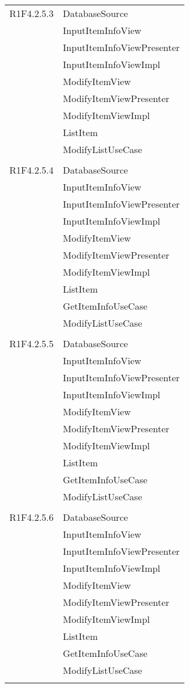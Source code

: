 \begin{center}
\begin{longtable}{|p{7cm}|p{5cm}|}
		R1F4.2.5.3 & DatabaseSource \\ & InputItemInfoView \\ & InputItemInfoViewPresenter \\ & InputItemInfoViewImpl \\ & ModifyItemView \\ & ModifyItemViewPresenter \\ & ModifyItemViewImpl \\ & ListItem \\ & ModifyListUseCase \\ & \\ \hline
		R1F4.2.5.4 & DatabaseSource \\ & InputItemInfoView \\ & InputItemInfoViewPresenter \\ & InputItemInfoViewImpl \\ & ModifyItemView \\ & ModifyItemViewPresenter \\ & ModifyItemViewImpl \\ & ListItem \\ & GetItemInfoUseCase \\ & ModifyListUseCase \\ & \\ \hline
		R1F4.2.5.5 & DatabaseSource \\ & InputItemInfoView \\ & InputItemInfoViewPresenter \\ & InputItemInfoViewImpl \\ & ModifyItemView \\ & ModifyItemViewPresenter \\ & ModifyItemViewImpl \\ & ListItem \\ & GetItemInfoUseCase \\ & ModifyListUseCase \\ & \\ \hline
		R1F4.2.5.6 & DatabaseSource \\ & InputItemInfoView \\ & InputItemInfoViewPresenter \\ & InputItemInfoViewImpl \\ & ModifyItemView \\ & ModifyItemViewPresenter \\ & ModifyItemViewImpl \\ & ListItem \\ & GetItemInfoUseCase \\ & ModifyListUseCase \\ & \\ \hline

\end{longtable}
\end{center}
